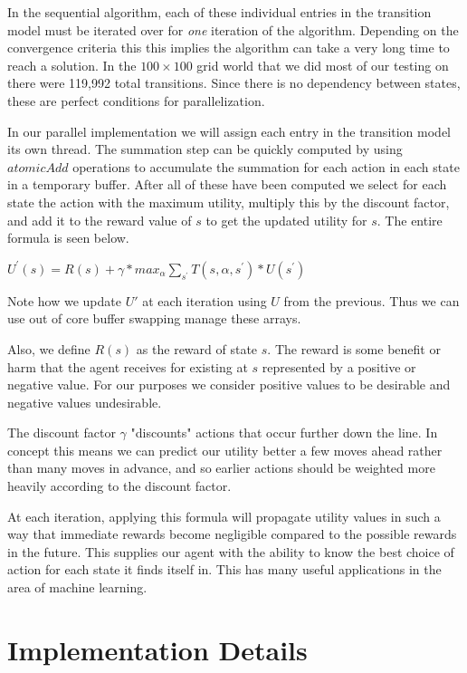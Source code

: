 \documentclass[letterpaper,twocolumn,10pt]{article}
\begin{document}
{In the sequential algorithm, each of these individual entries in the transition model must be iterated over for \textit{one} iteration of the algorithm. Depending on the convergence criteria this this implies the algorithm can take a very long time to reach a solution. In the $100 \times 100$ grid world that we did most of our testing on there were 119,992 total transitions. Since there is no dependency between states, these are perfect conditions for parallelization.

In our parallel implementation we will assign each entry in the transition model its own thread. The summation step can be quickly computed by using $atomicAdd$ operations to accumulate the summation for each action in each state in a temporary buffer. After all of these have been computed we select for each state the action with the maximum utility, multiply this by the discount factor, and add it to the reward value of $s$ to get the updated utility for $s$. The entire formula is seen below.

\begin{center}
	$U^\prime(s)=R(s)+\gamma * max_\alpha \sum_{s^\prime}T(s,\alpha,s^\prime)*U(s^\prime)$
\end{center}

Note how we update $U'$ at each iteration using $U$ from the previous. Thus we can use out of core buffer swapping manage these arrays.

Also, we define $R(s)$ as the reward of state $s$. The reward is some benefit or harm that the agent receives for existing at $s$ represented by a positive or negative value. For our purposes we consider positive values to be desirable and negative values undesirable.

The discount factor $\gamma$ "discounts" actions that occur further down the line. In concept this means we can predict our utility better a few moves ahead rather than many moves in advance, and so earlier actions should be weighted more heavily according to the discount factor.

At each iteration, applying this formula will propagate utility values in such a way that immediate rewards become negligible compared to the possible rewards in the future. This supplies our agent with the ability to know the best choice of action for each state it finds itself in. This has many useful applications in the area of machine learning.

\section{Implementation Details}

}
\end{document}
